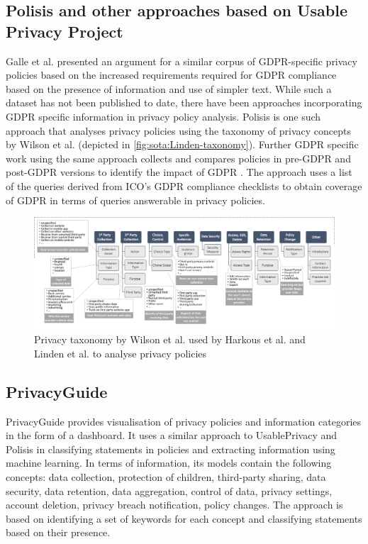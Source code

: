 \subsection*{Polisis and other approaches based on Usable Privacy Project}
Galle et al. \cite{galle_case_2019} presented an argument for a similar corpus of GDPR-specific privacy policies based on the increased requirements required for GDPR compliance based on the presence of information and use of simpler text. While such a dataset has not been published to date, there have been approaches incorporating GDPR specific information in privacy policy analysis.
Polisis \cite{harkous_polisis_2018} is one such approach that analyses privacy policies using the taxonomy of privacy concepts by Wilson et al. \cite{wilson_creation_2016} (depicted in \autoref{fig:sota:Linden-taxonomy}).
Further GDPR specific work using the same approach collects and compares policies in pre-GDPR and post-GDPR versions to identify the impact of GDPR \cite{linden_privacy_2018}. The approach uses a list of the queries derived from ICO’s GDPR compliance checklists to obtain coverage of GDPR in terms of queries answerable in privacy policies.
\begin{figure}[htbp]
    \centering
    \includegraphics[width=\linewidth]{img/Linden_taxonomy.png}
    \caption{Privacy taxonomy by Wilson et al. \cite{wilson_creation_2016} used by Harkous et al. \cite{harkous_polisis_2018} and Linden et al.  \cite{linden_privacy_2018} to analyse privacy policies}
    \label{fig:sota:Linden-taxonomy}
\end{figure}

\subsection*{PrivacyGuide}
PrivacyGuide \cite{tesfay_privacyguide_2018,westphal_spirit_2018} provides visualisation of privacy policies and information categories in the form of a dashboard. It uses a similar approach to UsablePrivacy and Polisis in classifying statements in policies and extracting information using machine learning. In terms of information, its models contain the following concepts: data collection, protection of children, third-party sharing, data security, data retention, data aggregation, control of data, privacy settings, account deletion, privacy breach notification, policy changes.
The approach is based on identifying a set of keywords for each concept and classifying statements based on their presence.

